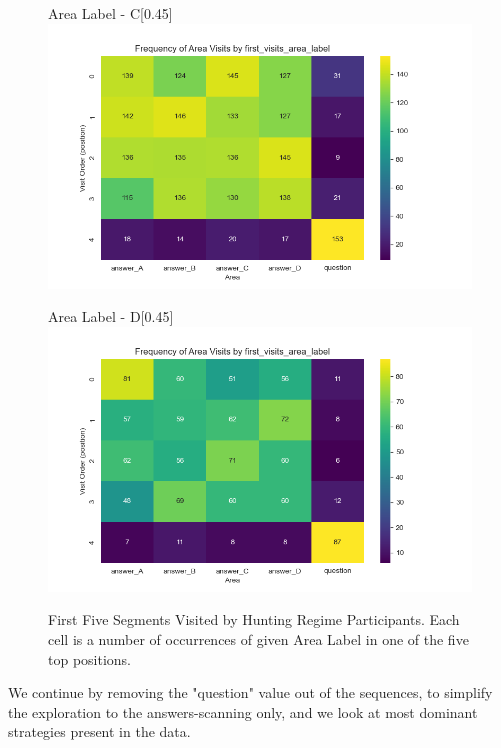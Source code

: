 \documentclass[manuscript,review,anonymous]{acmart}
\begin{document}
\begin{figure}[htbp]
          \begin{subcaptionbox}{Area Label - C\label{fig:cc}}[0.45\textwidth]
            {\centering\includegraphics[width=\linewidth]{plots/visits/matrix__first_visits_area_label_hunters_C.png}}
          \end{subcaptionbox}
          \hfill
          \begin{subcaptionbox}{Area Label - D\label{fig:dd}}[0.45\textwidth]
            {\centering\includegraphics[width=\linewidth]{plots/visits/matrix__first_visits_area_label_hunters_D.png}}
          \end{subcaptionbox}
          
          \caption{First Five Segments Visited by Hunting Regime Participants. Each cell is a number of occurrences of given Area Label in one of the five top positions.}
          \label{fig:hunt_first_lbl}
        \end{figure}


        We continue by removing the "question" value out of the sequences, to simplify the exploration to the answers-scanning only, and we look at most dominant strategies present in the data.
\end{document}
